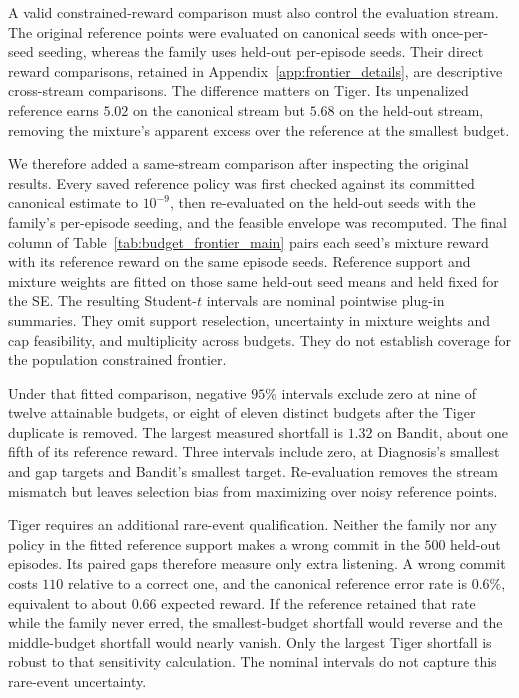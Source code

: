 A valid constrained-reward comparison must also control the evaluation stream. The original reference points were evaluated on canonical seeds with once-per-seed seeding, whereas the family uses held-out per-episode seeds. Their direct reward comparisons, retained in Appendix~\ref{app:frontier_details}, are descriptive cross-stream comparisons. The difference matters on Tiger. Its unpenalized reference earns $5.02$ on the canonical stream but $5.68$ on the held-out stream, removing the mixture's apparent excess over the reference at the smallest budget.

We therefore added a same-stream comparison after inspecting the original results. Every saved reference policy was first checked against its committed canonical estimate to $10^{-9}$, then re-evaluated on the held-out seeds with the family's per-episode seeding, and the feasible envelope was recomputed. The final column of Table~\ref{tab:budget_frontier_main} pairs each seed's mixture reward with its reference reward on the same episode seeds. Reference support and mixture weights are fitted on those same held-out seed means and held fixed for the SE. The resulting Student-$t$ intervals are nominal pointwise plug-in summaries. They omit support reselection, uncertainty in mixture weights and cap feasibility, and multiplicity across budgets. They do not establish coverage for the population constrained frontier.

Under that fitted comparison, negative $95\%$ intervals exclude zero at nine of twelve attainable budgets, or eight of eleven distinct budgets after the Tiger duplicate is removed. The largest measured shortfall is $1.32$ on Bandit, about one fifth of its reference reward. Three intervals include zero, at Diagnosis's smallest and gap targets and Bandit's smallest target. Re-evaluation removes the stream mismatch but leaves selection bias from maximizing over noisy reference points.

Tiger requires an additional rare-event qualification. Neither the family nor any policy in the fitted reference support makes a wrong commit in the $500$ held-out episodes. Its paired gaps therefore measure only extra listening. A wrong commit costs $110$ relative to a correct one, and the canonical reference error rate is $0.6\%$, equivalent to about $0.66$ expected reward. If the reference retained that rate while the family never erred, the smallest-budget shortfall would reverse and the middle-budget shortfall would nearly vanish. Only the largest Tiger shortfall is robust to that sensitivity calculation. The nominal intervals do not capture this rare-event uncertainty.

